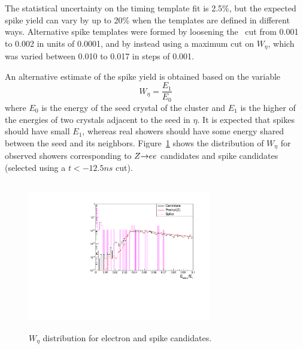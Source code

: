 The statistical uncertainty on the timing template fit is 2.5\%, but the expected spike yield can vary by up to 20\% when the templates are defined
in different ways. Alternative spike templates were formed by loosening the \sieie\ cut from 0.001 to 0.002 in units of 0.0001,
and by instead using a maximum cut on $W_{\eta}$, which was varied between 0.010 to 0.017 in steps of 0.001.

An alternative estimate of the spike yield is obtained based on the variable
\begin{equation}
W_{\eta} = \frac{E_{1}}{E_{0}}
\end{equation}
where $E_{0}$ is the energy of the seed crystal of the cluster and $E_{1}$ is the higher of the energies of two crystals adjacent to the seed in $\eta$.
It is expected that spikes should have small $E_{1}$, whereas real showers should have some energy shared between the seed and its neighbors.
Figure~\ref{fig:etawing} shows the distribution of $W_{\eta}$ for observed showers corresponding to
$Z{\rightarrow}ee$ candidates and spike candidates (selected using a $t < -12.5\unit{ns}$ cut).

\begin{figure}[tbp]
  \begin{center}
    \includegraphics[width=8cm,height=6.5cm]{Figures/noncol/EtaWingCompZLog.pdf}
    \caption{$W_{\eta}$ distribution for electron and spike candidates.}
    \label{fig:etawing}
  \end{center}
\end{figure}

